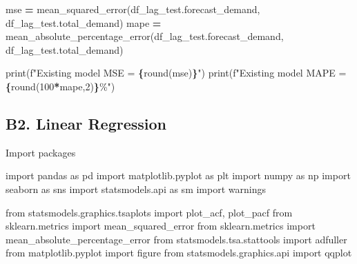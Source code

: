 \documentclass[mstat,12pt]{unswthesis}
\newenvironment{Shaded}{\begin{snugshade}}{\end{snugshade}}
\newcommand{\BuiltInTok}[1]{#1}
\newcommand{\DecValTok}[1]{\textcolor[rgb]{0.00,0.00,0.81}{#1}}
\newcommand{\ImportTok}[1]{#1}
\newcommand{\NormalTok}[1]{#1}
\newcommand{\OperatorTok}[1]{\textcolor[rgb]{0.81,0.36,0.00}{\textbf{#1}}}
\newcommand{\SpecialCharTok}[1]{\textcolor[rgb]{0.81,0.36,0.00}{\textbf{#1}}}
\newcommand{\SpecialStringTok}[1]{\textcolor[rgb]{0.31,0.60,0.02}{#1}}
\begin{document}
\begin{Shaded}
\begin{Highlighting}[]
\NormalTok{mse }\OperatorTok{=}\NormalTok{ mean\_squared\_error(df\_lag\_test.forecast\_demand, }
\NormalTok{    df\_lag\_test.total\_demand)}
\NormalTok{mape }\OperatorTok{=}\NormalTok{  mean\_absolute\_percentage\_error(df\_lag\_test.forecast\_demand, }
\NormalTok{    df\_lag\_test.total\_demand)}

\BuiltInTok{print}\NormalTok{(}\SpecialStringTok{f"Existing model MSE = }\SpecialCharTok{\{}\BuiltInTok{round}\NormalTok{(mse)}\SpecialCharTok{\}}\SpecialStringTok{"}\NormalTok{)}
\BuiltInTok{print}\NormalTok{(}\SpecialStringTok{f"Existing model MAPE = }\SpecialCharTok{\{}\BuiltInTok{round}\NormalTok{(}\DecValTok{100}\OperatorTok{*}\NormalTok{mape,}\DecValTok{2}\NormalTok{)}\SpecialCharTok{\}}\SpecialStringTok{\%"}\NormalTok{)}
\end{Highlighting}
\end{Shaded}

\subsection*{B2. Linear Regression}\label{b2.-linear-regression}

Import packages

\begin{Shaded}
\begin{Highlighting}[]
\ImportTok{import}\NormalTok{ pandas }\ImportTok{as}\NormalTok{ pd}
\ImportTok{import}\NormalTok{ matplotlib.pyplot }\ImportTok{as}\NormalTok{ plt}
\ImportTok{import}\NormalTok{ numpy }\ImportTok{as}\NormalTok{ np}
\ImportTok{import}\NormalTok{ seaborn }\ImportTok{as}\NormalTok{ sns}
\ImportTok{import}\NormalTok{ statsmodels.api }\ImportTok{as}\NormalTok{ sm}
\ImportTok{import}\NormalTok{ warnings}

\ImportTok{from}\NormalTok{ statsmodels.graphics.tsaplots }\ImportTok{import}\NormalTok{ plot\_acf, plot\_pacf}
\ImportTok{from}\NormalTok{ sklearn.metrics }\ImportTok{import}\NormalTok{ mean\_squared\_error}
\ImportTok{from}\NormalTok{ sklearn.metrics }\ImportTok{import}\NormalTok{ mean\_absolute\_percentage\_error}
\ImportTok{from}\NormalTok{ statsmodels.tsa.stattools }\ImportTok{import}\NormalTok{ adfuller}
\ImportTok{from}\NormalTok{ matplotlib.pyplot }\ImportTok{import}\NormalTok{ figure}
\ImportTok{from}\NormalTok{ statsmodels.graphics.api }\ImportTok{import}\NormalTok{ qqplot}
\end{Highlighting}
\end{Shaded}
\end{document}
